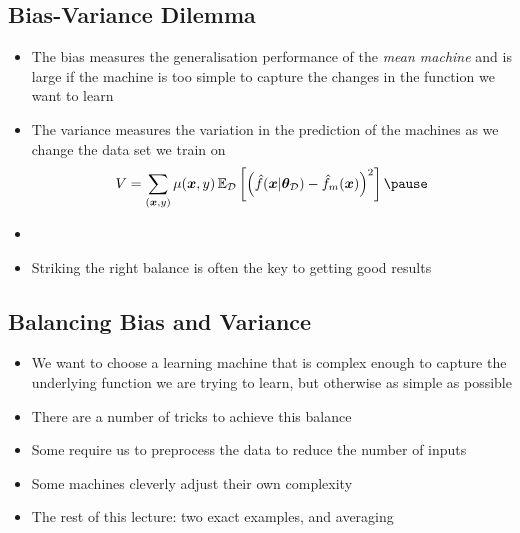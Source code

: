 
\begin{slide}
\section{Bias-Variance Dilemma}

\begin{PauseHighLight}
  \begin{itemize}
  \item The bias measures the generalisation performance of the
    \textit{mean machine} and is large if the machine is too simple to
    capture the changes in the function we want to learn\pause
  \item The variance measures the variation in the prediction of the
    machines as we change the data set we train on
    \begin{align*}
      V =  \sum_{(\bm{x},y)} \mu(\bm{x},y)\,
      \av[\mathcal{D}]{ \left(\hat{f}(\bm{x}\vert \bm{\theta}_{\mathcal{D}})
      - \hat{f}_m(\bm{x})\right)^2 }\pause
    \end{align*}
  \item {}\pause
  \item Striking the right balance is often the key to getting good
    results\pause 
  \end{itemize}
\end{PauseHighLight}

\end{slide}


\begin{slide}
\section[-1]{Balancing Bias and Variance}

\begin{PauseHighLight}
  \begin{itemize}
  \item We want to choose a learning machine that is complex enough to
    capture the underlying function we are trying to learn, but
    otherwise as simple as possible\pause
  \item There are a number of tricks to achieve this balance\pause
  \item Some require us to preprocess the data to reduce the number of
    inputs\pause
  \item Some machines cleverly adjust their own complexity\pause
  \item The rest of this lecture: two exact examples, and averaging\pause
  \end{itemize}
\end{PauseHighLight}

\end{slide}

